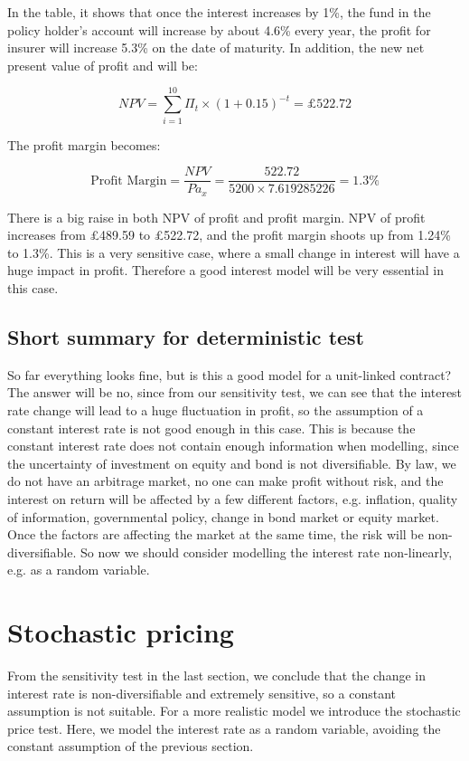\documentclass{report}
\begin{document}
{In the table, it shows that once the interest increases by 1\%, the fund in the policy holder's account will increase by about 4.6\% every year, the profit for insurer will increase 5.3\% on the date of maturity. In addition, the new net present value of profit and will be:

\[
 NPV=\sum_{i=1}^{10} \Pi_t \times (1+0.15)^{-t} = \pounds522.72
\]
 
The profit margin becomes:


\[
\text{Profit Margin} =  \frac{NPV}{P \ddot{a}_x} = \frac{522.72}{5200 \times 7.619285226} = 1.3\%
\]

There is a big raise in both NPV of profit and profit margin. NPV of profit increases from \pounds489.59 to \pounds522.72, and the profit margin shoots up from 1.24\% to 1.3\%. This is a very sensitive case, where a small change in interest will have a huge impact in profit. Therefore a good interest model will be very essential in this case.
 





\subsection{Short summary for deterministic test}
So far everything looks fine, but is this a good model for a unit-linked contract? The answer will be no, since from our sensitivity test, we can see that the interest rate change will lead to a huge fluctuation in profit, so the assumption of a constant interest rate is not good enough in this case. This is because the constant interest rate does not contain  enough information when modelling, since the uncertainty of investment on equity and bond is not diversifiable. By law, we do not have an arbitrage market, no one can make profit without risk, and the interest on return will be affected by a few different factors, \cite{bib:riskfactor} e.g. inflation, quality of information, governmental policy, change in bond market or equity market. Once the factors  are affecting the market at the same time, the risk will be non-diversifiable. So now we should consider modelling the interest rate non-linearly, e.g. as a random variable. 




\section{Stochastic pricing}

From the sensitivity test in the last section, we conclude that the change in interest rate is non-diversifiable and extremely sensitive, so a constant assumption is not suitable. 
For a more realistic model we introduce the stochastic price test. Here, we model the interest rate as a random variable, avoiding the constant assumption of the previous section.


}
\end{document}
